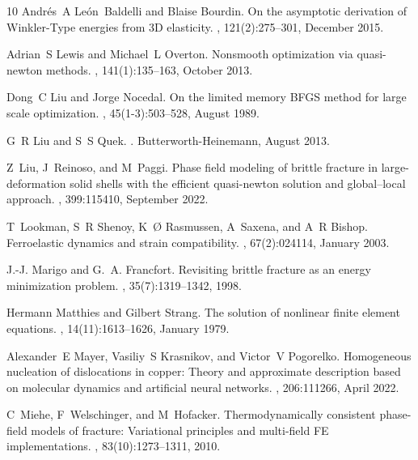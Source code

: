\documentclass[10pt]{article}
\begin{document}
\begin{thebibliography}{10}
    Andr{\'e}s~A Le{\'o}n~Baldelli and Blaise Bourdin.
    \newblock On the asymptotic derivation of {Winkler-Type} energies from {3D} elasticity.
    , 121(2):275--301, December 2015.

    Adrian~S Lewis and Michael~L Overton.
    \newblock Nonsmooth optimization via quasi-newton methods.
    , 141(1):135--163, October 2013.

    Dong~C Liu and Jorge Nocedal.
    \newblock On the limited memory {BFGS} method for large scale optimization.
    , 45(1-3):503--528, August 1989.

    G~R Liu and S~S Quek.
    .
    \newblock Butterworth-Heinemann, August 2013.

    Z~Liu, J~Reinoso, and M~Paggi.
    \newblock Phase field modeling of brittle fracture in large-deformation solid shells with the efficient quasi-newton solution and global--local approach.
    , 399:115410, September 2022.

    T~Lookman, S~R Shenoy, K~{\O} Rasmussen, A~Saxena, and A~R Bishop.
    \newblock Ferroelastic dynamics and strain compatibility.
    , 67(2):024114, January 2003.

    J.-J. Marigo and G.~A. Francfort.
    \newblock Revisiting brittle fracture as an energy minimization problem.
    , 35(7):1319--1342, 1998.

    Hermann Matthies and Gilbert Strang.
    \newblock The solution of nonlinear finite element equations.
    , 14(11):1613--1626, January 1979.

    Alexander~E Mayer, Vasiliy~S Krasnikov, and Victor~V Pogorelko.
    \newblock Homogeneous nucleation of dislocations in copper: Theory and approximate description based on molecular dynamics and artificial neural networks.
    , 206:111266, April 2022.

    C~Miehe, F~Welschinger, and M~Hofacker.
    \newblock Thermodynamically consistent phase-field models of fracture: Variational principles and multi-field {FE} implementations.
    , 83(10):1273--1311, 2010.


\end{thebibliography}
\end{document}
